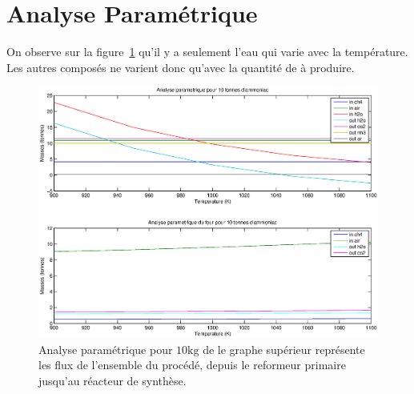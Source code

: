 \section{Analyse Paramétrique}

On observe sur la figure~\ref{fig:analyseParam} qu'il y a seulement l'eau 
qui varie avec la température.
Les autres composés ne varient donc qu'avec la quantité de  à produire.

\begin{figure}[h!]
	\begin{center}
		\includegraphics[scale=0.5]{../tache1/img/analyseParam.eps}
	\end{center}
	\caption{Analyse paramétrique pour $10\si{\kilogram}$ de 
		le graphe supérieur représente les flux de l'ensemble du 
		procédé, depuis le reformeur primaire jusqu'au réacteur de synthèse.}
	\label{fig:analyseParam}
\end{figure}


